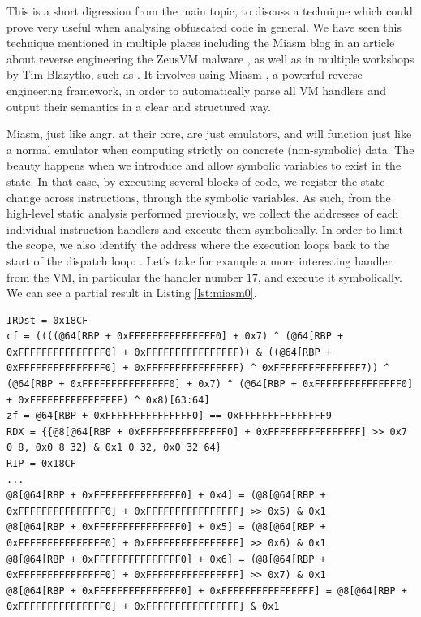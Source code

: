 This is a short digression from the main topic, to discuss a technique which could prove very useful when analysing obfuscated code in general. We have seen this technique mentioned in multiple places including the Miasm blog in an article about reverse engineering the ZeusVM malware \cite{zeusvm_miasm}, as well as in multiple workshops by Tim Blazytko, such as \cite{tim_miasm}. It involves using Miasm \cite{miasm}, a powerful reverse engineering framework, in order to automatically parse all \gls{VM} handlers and output their semantics in a clear and structured way. 

Miasm, just like angr, at their core, are just emulators, and will function just like a normal emulator when computing strictly on concrete (non-symbolic) data. The beauty happens when we introduce and allow symbolic variables to exist in the state. In that case, by executing several blocks of code, we register the state change across instructions, through the symbolic variables. As such, from the high-level static analysis performed previously, we collect the addresses of each individual instruction handlers and execute them symbolically. In order to limit the scope, we also identify the address where the execution loops back to the start of the dispatch loop: . Let's take for example a more interesting handler from the  \gls{VM}, in particular the handler number $17$, and execute it symbolically. We can see a partial result in Listing \ref{lst:miasm0}. 

\begin{lstlisting}[label={lst:miasm0}, caption={TODO}]
IRDst = 0x18CF
cf = ((((@64[RBP + 0xFFFFFFFFFFFFFFF0] + 0x7) ^ (@64[RBP + 0xFFFFFFFFFFFFFFF0] + 0xFFFFFFFFFFFFFFFF)) & ((@64[RBP + 0xFFFFFFFFFFFFFFF0] + 0xFFFFFFFFFFFFFFFF) ^ 0xFFFFFFFFFFFFFFF7)) ^ (@64[RBP + 0xFFFFFFFFFFFFFFF0] + 0x7) ^ (@64[RBP + 0xFFFFFFFFFFFFFFF0] + 0xFFFFFFFFFFFFFFFF) ^ 0x8)[63:64]
zf = @64[RBP + 0xFFFFFFFFFFFFFFF0] == 0xFFFFFFFFFFFFFFF9
RDX = {{@8[@64[RBP + 0xFFFFFFFFFFFFFFF0] + 0xFFFFFFFFFFFFFFFF] >> 0x7 0 8, 0x0 8 32} & 0x1 0 32, 0x0 32 64}
RIP = 0x18CF
...
@8[@64[RBP + 0xFFFFFFFFFFFFFFF0] + 0x4] = (@8[@64[RBP + 0xFFFFFFFFFFFFFFF0] + 0xFFFFFFFFFFFFFFFF] >> 0x5) & 0x1
@8[@64[RBP + 0xFFFFFFFFFFFFFFF0] + 0x5] = (@8[@64[RBP + 0xFFFFFFFFFFFFFFF0] + 0xFFFFFFFFFFFFFFFF] >> 0x6) & 0x1
@8[@64[RBP + 0xFFFFFFFFFFFFFFF0] + 0x6] = (@8[@64[RBP + 0xFFFFFFFFFFFFFFF0] + 0xFFFFFFFFFFFFFFFF] >> 0x7) & 0x1
@8[@64[RBP + 0xFFFFFFFFFFFFFFF0] + 0xFFFFFFFFFFFFFFFF] = @8[@64[RBP + 0xFFFFFFFFFFFFFFF0] + 0xFFFFFFFFFFFFFFFF] & 0x1
\end{lstlisting}

